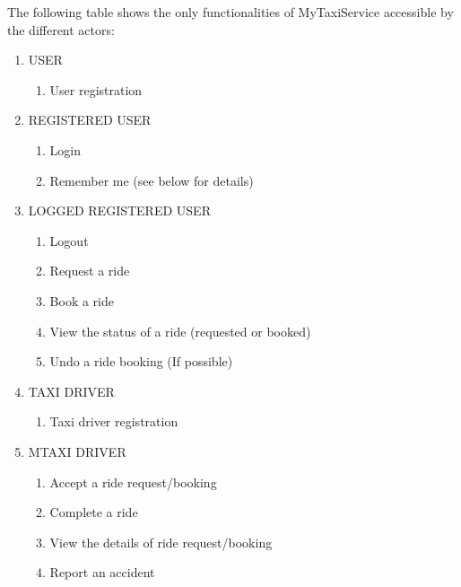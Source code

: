 \documentclass[11pt,titlepage]{article} %
\begin{document}
      The following table shows the only functionalities of MyTaxiService accessible by
      the different actors:
      \begin{enumerate}
	      \item USER
		\begin{enumerate}
		      \item User registration
		\end{enumerate}
	
	      \item REGISTERED USER
		\begin{enumerate}
		      \item Login
		      \item Remember me (see below for details)
		\end{enumerate}
	
	      \item LOGGED REGISTERED USER
		\begin{enumerate}
		      \item Logout
		      \item Request a ride
		      \item Book a ride
		      \item View the status of a ride (requested or booked)
		      \item Undo a ride booking (If possible)
		\end{enumerate}
	
	
	      \item TAXI DRIVER
		\begin{enumerate}
		      \item Taxi driver registration
		\end{enumerate}
	
	      \item MTAXI DRIVER
		\begin{enumerate}
		      \item Accept a ride request/booking
		      \item Complete a ride
		      \item View the details of ride request/booking
		      \item Report an accident
		\end{enumerate}
	

\end{enumerate}
\end{document}
